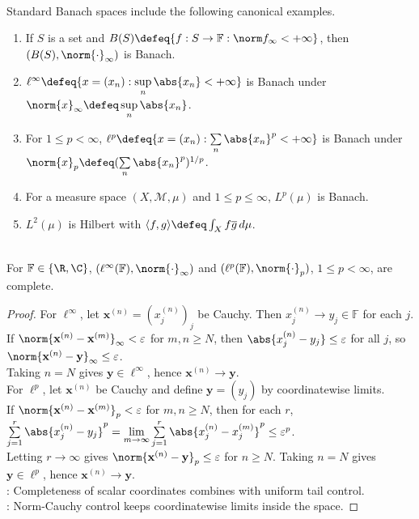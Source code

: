 \begin{example} \label{ex:standard-banach-space-examples} \\
Standard Banach spaces include the following canonical examples.
\begin{enumerate}[label=(\roman*)]
\setlength{\itemsep}{0pt}
\item If $S$ is a set and $B(S)\defeq\{f:S\to\mathbb F:\norm f_\infty<+\infty\}$, then $(B(S),\norm{\cdot}_\infty)$ is Banach.
\item $\ell^\infty\defeq\{x=(x_n):\sup\limits_n\abs{x_n}<+\infty\}$ is Banach under $\norm{x}_\infty\defeq\sup\limits_n\abs{x_n}$.
\item For $1\leq p<\infty$, $\ell^p\defeq\{x=(x_n):\sum\limits_n\abs{x_n}^p<+\infty\}$ is Banach under $\norm{x}_p\defeq(\sum\limits_n\abs{x_n}^p)^{1/p}$.
\item For a measure space $(X,\mathcal M,\mu)$ and $1\leq p\leq\infty$, $L^p(\mu)$ is Banach.
\item $L^2(\mu)$ is Hilbert with $\langle f,g\rangle\defeq\int_X f\overline g\,d\mu$.
\end{enumerate}
\end{example}

\begin{example} \label{ex:sequence-spaces-complete} \\
For $\mathbb{F}\in\{\R,\C\}$, $(\ell^\infty(\mathbb{F}),\norm{\cdot}_\infty)$ and $(\ell^p(\mathbb{F}),\norm{\cdot}_p)$, $1\leq p<\infty$, are complete.
\begin{proof}
For $\ell^\infty$, let $\mathbf{x}^{(n)}=(x_j^{(n)})_j$ be Cauchy. Then $x_j^{(n)}\to y_j\in\mathbb{F}$ for each $j$.\\
If $\norm{\mathbf{x}^{(n)}-\mathbf{x}^{(m)}}_\infty<\varepsilon$ for $m,n\geq N$, then $\abs{x_j^{(n)}-y_j}\leq\varepsilon$ for all $j$, so $\norm{\mathbf{x}^{(n)}-\mathbf{y}}_\infty\leq\varepsilon$.\\
Taking $n=N$ gives $\mathbf{y}\in\ell^\infty$, hence $\mathbf{x}^{(n)}\to\mathbf{y}$.\\
For $\ell^p$, let $\mathbf{x}^{(n)}$ be Cauchy and define $\mathbf{y}=(y_j)$ by coordinatewise limits.\\
If $\norm{\mathbf{x}^{(n)}-\mathbf{x}^{(m)}}_p<\varepsilon$ for $m,n\geq N$, then for each $r$, $\sum\limits_{j=1}^{r}\abs{x_j^{(n)}-y_j}^{p}=\lim\limits_{m\to\infty}\sum\limits_{j=1}^{r}\abs{x_j^{(n)}-x_j^{(m)}}^{p}\leq\varepsilon^p$.\\
Letting $r\to\infty$ gives $\norm{\mathbf{x}^{(n)}-\mathbf{y}}_p\leq\varepsilon$ for $n\geq N$. Taking $n=N$ gives $\mathbf{y}\in\ell^p$, hence $\mathbf{x}^{(n)}\to\mathbf{y}$.\\
: Completeness of scalar coordinates combines with uniform tail control.\\
: Norm-Cauchy control keeps coordinatewise limits inside the space.
\end{proof}
\end{example}

